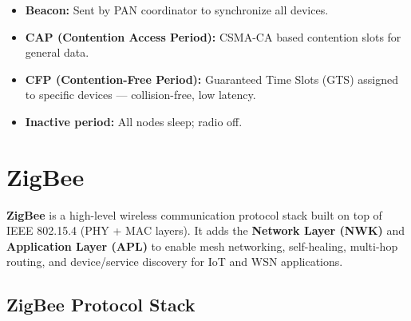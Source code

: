 \documentclass[12pt,a4paper]{article}
\begin{document}
\begin{itemize}[leftmargin=*, itemsep=3pt]
  \item \textbf{Beacon:} Sent by PAN coordinator to synchronize all devices.
  \item \textbf{CAP (Contention Access Period):} CSMA-CA based contention slots for general data.
  \item \textbf{CFP (Contention-Free Period):} Guaranteed Time Slots (GTS) assigned to specific devices --- collision-free, low latency.
  \item \textbf{Inactive period:} All nodes sleep; radio off.
\end{itemize}

\section{ZigBee}

\begin{tcolorbox}[defbox, title={\textbf{ZigBee --- Definition}}]
\textbf{ZigBee} is a high-level wireless communication protocol stack built on top of IEEE 802.15.4 (PHY + MAC layers). It adds the \textbf{Network Layer (NWK)} and \textbf{Application Layer (APL)} to enable mesh networking, self-healing, multi-hop routing, and device/service discovery for IoT and WSN applications.
\end{tcolorbox}

\subsection{ZigBee Protocol Stack}
\end{document}
